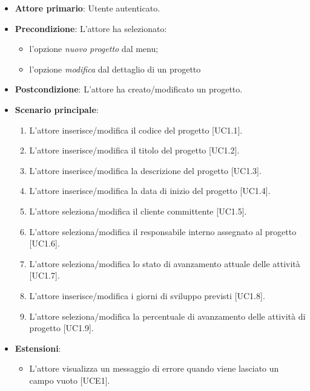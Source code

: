 \begin{itemize}
\item \textbf{Attore primario}: Utente autenticato.
\item \textbf{Precondizione}: L'attore ha selezionato: 
\begin{itemize}
\item l'opzione \textit{nuovo progetto} dal menu;
\item l'opzione \textit{modifica} dal dettaglio di un progetto
\end{itemize}
\item \textbf{Postcondizione}: L'attore ha creato/modificato un progetto.
\pagebreak
\item \textbf{Scenario principale}: 
\begin{enumerate}
\item L'attore inserisce/modifica il codice del progetto [UC1.1].
\item L'attore inserisce/modifica il titolo del progetto [UC1.2].
\item L'attore inserisce/modifica la descrizione del progetto [UC1.3].
\item L'attore inserisce/modifica la data di inizio del progetto [UC1.4].
\item L'attore seleziona/modifica il cliente committente [UC1.5].
\item L'attore seleziona/modifica il responsabile interno assegnato al progetto [UC1.6].
\item L'attore seleziona/modifica lo stato di avanzamento attuale delle attività [UC1.7].
\item L'attore inserisce/modifica i giorni di sviluppo previsti [UC1.8].
\item L'attore seleziona/modifica la percentuale di avanzamento delle attività di progetto [UC1.9].
\end{enumerate}
\item \textbf{Estensioni}: 
\begin{itemize}
\item L'attore visualizza un messaggio di errore quando viene lasciato un campo vuoto [UCE1].
\end{itemize} 
\end{itemize}

